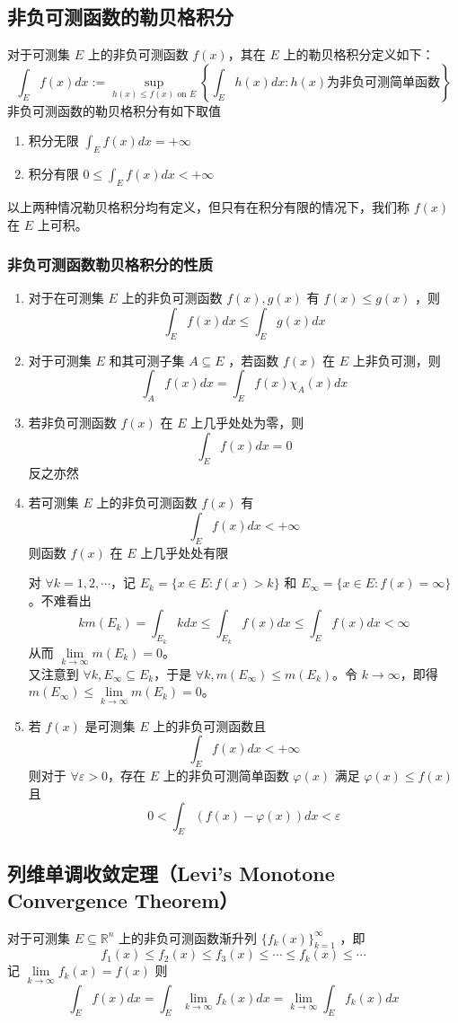 \documentclass{ctexbook}
\newcommand{\no}{\noindent}
\newcommand{\pro}{\no{\bf 证明：}}
\newcommand{\R}{\mathbb{R}}
\newcommand{\ITEMS}{\begin{enumerate}[leftmargin=4em]}
\newcommand{\ITEME}{\end{enumerate}}
\begin{document}
\subsection{非负可测函数的勒贝格积分}

对于可测集 $E$ 上的非负可测函数 $f(x)$，其在 $E$ 上的勒贝格积分定义如下：
\[
\int_E f(x)dx := \sup_{h(x)\le f(x)\text{ on }E} \left\{\int_Eh(x)dx : h(x) \mbox{为非负可测简单函数}\right\}
\]
非负可测函数的勒贝格积分有如下取值
\ITEMS
\item 积分无限 $\int_E f(x) dx = +\infty$
\item 积分有限 $0 \le \int_E f(x) dx < +\infty$
\ITEME 
以上两种情况勒贝格积分均有定义，但只有在积分有限的情况下，我们称 $f(x)$ 在 $E$ 上可积。

\subsubsection{非负可测函数勒贝格积分的性质}

\ITEMS
\item 对于在可测集 $E$ 上的非负可测函数 $f(x),g(x)$ 有 $f(x) \le g(x)$ ，则 	
\[
\int_E f(x) dx \le \int_E g(x) dx
\]

\item 对于可测集 $E$ 和其可测子集 $A \subseteq E$ ，若函数 $f(x)$ 在 $E$ 上非负可测，则
\[
\int_A f(x) dx = \int_E f(x) \chi_{A}(x) dx
\]

\item 若非负可测函数 $f(x)$ 在 $E$ 上几乎处处为零，则
\[
\int_E f(x) dx = 0
\]
反之亦然
\item 若可测集 $E$ 上的非负可测函数 $f(x)$ 有
\[
\int_E f(x) dx < +\infty
\]
则函数 $f(x)$ 在 $E$ 上几乎处处有限

\pro  对 $\forall k=1,2,\cdots$，记 $E_k=\{x\in E: f(x)>k\}$ 和 $E_{\infty}=\{x\in E: f(x)=\infty\}$。不难看出
$$km(E_k)=\int_{E_k} k dx\le\int_{E_k} f(x) dx\le\int_E f(x) dx<\infty$$
从而 $\lim\limits_{k\to \infty}m(E_k)=0$。\\
又注意到 $\forall k, E_{\infty}\subseteq E_k$，于是 $\forall k, m(E_{\infty})\le m(E_k)$。令 $k\to \infty$，即得 $m(E_{\infty})\le\lim\limits_{k\to \infty} m(E_k)=0$。
\item 若 $f(x)$ 是可测集 $E$ 上的非负可测函数且
\[
\int_E f(x) dx < +\infty
\]
则对于 $\forall \varepsilon > 0$，存在 $E$ 上的非负可测简单函数 $\varphi(x)$ 满足 $\varphi(x) \le f(x)$ 且
\[
0 < \int_E (f(x) - \varphi(x))dx <\varepsilon
\]
\ITEME

\subsection{列维单调收敛定理（Levi's Monotone  Convergence Theorem）}
对于可测集 $E \subseteq \R^n$ 上的非负可测函数渐升列 $\{ f_k(x) \}_{k=1}^\infty$ ，即
\[
f_1(x) \le f_2(x) \le f_3(x) \le \cdots \le f_k(x) \le \cdots
\]
记 $\lim\limits_{k\to\infty} f_k(x) = f(x)$ 则
\[
\int_E f(x) dx = \int_E \lim_{k\to\infty} f_k (x) dx = \lim_{k\to\infty} \int_E f_k(x) dx
\]
\end{document}

